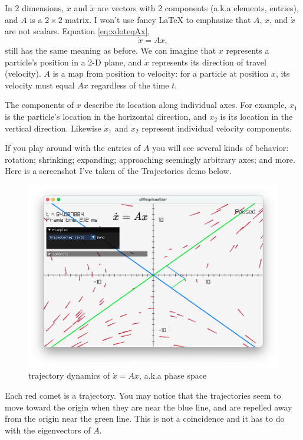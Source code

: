\documentclass[11pt, oneside]{article}   	%
\begin{document}
In 2 dimensions, $x$ and $\dot{x}$ are vectors with 2 components (a.k.a elements, entries), and $A$ is a $2\times 2$ matrix.
I won't use fancy LaTeX to emphasize that $A$, $x$, and $\dot{x}$ are not scalars.
Equation \ref*{eq:xdoteqAx},
$$ \dot{x} = Ax ,$$
still has the same meaning as before.
We can imagine that $x$ represents a particle's position in a 2-D plane,
and $\dot{x}$ represents its direction of travel (velocity).
$A$ is a map from position to velocity: for a particle at position $x$, its velocity must equal $Ax$ regardless of the time $t$.

The components of $x$ describe its location along individual axes.
For example, $x_1$ is the particle's location in the horizontal direction,
and $x_2$ is its location in the vertical direction.
Likewise $\dot{x}_1$ and $\dot{x}_2$ represent individual velocity components.

If you play around with the entries of $A$ you will see several kinds of behavior:
rotation;
shrinking;
expanding;
approaching seemingly arbitrary axes;
and more.
Here is a screenshot I've taken of the Trajectories demo below.

\begin{figure}[h]
\centering
\includegraphics[scale=0.45]{screenshot_trajectories}
\caption{trajectory dynamics of $\dot{x} = Ax$, a.k.a phase space}
\label{fig:Trajectories}
\end{figure}

Each red comet is a trajectory.
You may notice that the trajectories seem to move toward the origin when they are near the blue line,
and are repelled away from the origin near the green line.
This is not a coincidence and it has to do with the eigenvectors of $A$.
\end{document}
